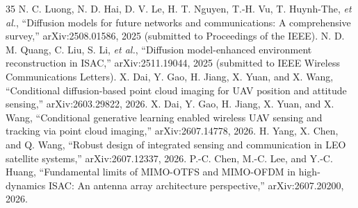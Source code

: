\documentclass[11pt]{article}
\begin{document}
\begin{thebibliography}{35}
 N. C. Luong, N. D. Hai, D. V. Le, H. T. Nguyen, T.-H. Vu, T. Huynh-The, \emph{et al.}, ``Diffusion models for future networks and communications: A comprehensive survey,'' arXiv:2508.01586, 2025 (submitted to Proceedings of the IEEE).
 N. D. M. Quang, C. Liu, S. Li, \emph{et al.}, ``Diffusion model-enhanced environment reconstruction in ISAC,'' arXiv:2511.19044, 2025 (submitted to IEEE Wireless Communications Letters).
 X. Dai, Y. Gao, H. Jiang, X. Yuan, and X. Wang, ``Conditional diffusion-based point cloud imaging for UAV position and attitude sensing,'' arXiv:2603.29822, 2026.
 X. Dai, Y. Gao, H. Jiang, X. Yuan, and X. Wang, ``Conditional generative learning enabled wireless UAV sensing and tracking via point cloud imaging,'' arXiv:2607.14778, 2026.
 H. Yang, X. Chen, and Q. Wang, ``Robust design of integrated sensing and communication in LEO satellite systems,'' arXiv:2607.12337, 2026.
 P.-C. Chen, M.-C. Lee, and Y.-C. Huang, ``Fundamental limits of MIMO-OTFS and MIMO-OFDM in high-dynamics ISAC: An antenna array architecture perspective,'' arXiv:2607.20200, 2026.
\end{thebibliography}
\end{document}

